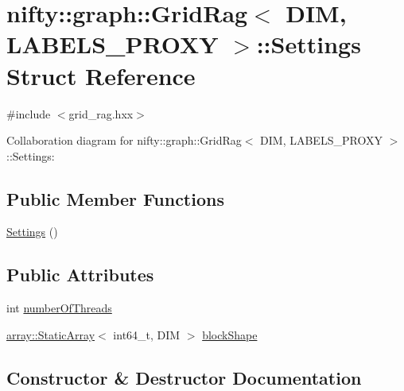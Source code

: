 \hypertarget{structnifty_1_1graph_1_1GridRag_1_1Settings}{}\section{nifty\+:\+:graph\+:\+:Grid\+Rag$<$ D\+I\+M, L\+A\+B\+E\+L\+S\+\_\+\+P\+R\+O\+X\+Y $>$\+:\+:Settings Struct Reference}
\label{structnifty_1_1graph_1_1GridRag_1_1Settings}


{\ttfamily \#include $<$grid\+\_\+rag.\+hxx$>$}



Collaboration diagram for nifty\+:\+:graph\+:\+:Grid\+Rag$<$ D\+I\+M, L\+A\+B\+E\+L\+S\+\_\+\+P\+R\+O\+X\+Y $>$\+:\+:Settings\+:
\subsection*{Public Member Functions}
\begin{DoxyCompactItemize}
\item 
\hyperlink{structnifty_1_1graph_1_1GridRag_1_1Settings_ab74b42adb3edae11a0a9de5f761467f8}{Settings} ()
\end{DoxyCompactItemize}
\subsection*{Public Attributes}
\begin{DoxyCompactItemize}
\item 
int \hyperlink{structnifty_1_1graph_1_1GridRag_1_1Settings_ac1e055fb552015ad19a2686e93e83436}{number\+Of\+Threads}
\item 
\hyperlink{namespacenifty_1_1array_a683f151f19c851754e0c6d55ed16a0c2}{array\+::\+Static\+Array}$<$ int64\+\_\+t, D\+I\+M $>$ \hyperlink{structnifty_1_1graph_1_1GridRag_1_1Settings_aaec8f76fa3dd464478f2dbefbbd6aeac}{block\+Shape}
\end{DoxyCompactItemize}


\subsection{Constructor \& Destructor Documentation}
\hypertarget{structnifty_1_1graph_1_1GridRag_1_1Settings_ab74b42adb3edae11a0a9de5f761467f8}{}
